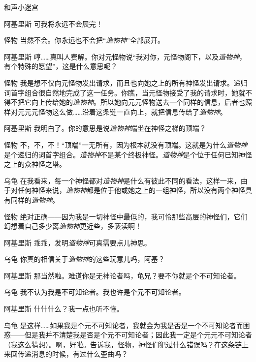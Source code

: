 \begin{dialog}{和声小迷宫}
\begin{dialogue}
\begin{dialogue}
\begin{dialogue}
    \item[阿基里斯]可我将永远不会展完！

    \item[怪物]当然不会。你永远也不会把“\emph{造物神}”全部展开。

    \item[阿基里斯]哼……真叫人费解。你对元怪物说“我对你，元怪物阁下，以及\emph{造物神}，有个特殊的愿望”，这是什么意思呢？

    \item[怪物]我是想不仅向元怪物发出请求，而且也向她之上的所有神怪发出请求。递归词首字组合很自然地完成了这一任务。你瞧，当元怪物接受了我的请求时，她就不得不把它向上传给她的\emph{造物神}。所以她向元元怪物送去一个同样的信息，后者也照样对元元元怪物这么做……沿着这条链一直向上，就把信息传给了\emph{造物神}。

    \item[阿基里斯]我明白了。你的意思是说\emph{造物神}端坐在神怪之梯的顶端？

    \item[怪物]不，不，不！“顶端”一无所有，因为根本就没有顶端。这就是为什么\emph{造物神}是个递归的词首字组合。\emph{造物神}不是某个终极神怪。\emph{造物神}是个位于任何已知神怪之上的众神怪之塔。

    \item[乌龟]在我看来，每一个神怪都对\emph{造物神}是什么有彼此不同的看法，这样一来，由于对任何神怪来说，\emph{造物神}都是位于他或她之上的一组神怪，所以没有两个神怪具有同样的\emph{造物神}。

    \item[怪物]绝对正确——因为我是一切神怪中最低的，我可怜那些高层的神怪们，它们幻想着自己多少离\emph{造物神}更近些，多亵渎啊！

    \item[阿基里斯]乖乖，发明\emph{造物神}可真需要点儿神思。

    \item[乌龟]你真的相信关于\emph{造物神}的这些玩意儿吗，阿基？

    \item[阿基里斯]那当然啦。难道你是无神论者吗，龟兄？要不你就是个不可知论者。

    \item[乌龟]我不认为我是不可知论者。我也许是个元不可知论者。

    \item[阿基里斯]什什什么？我一点也听不懂。

    \item[乌龟]是这样……如果我是个元不可知论者，我就会为我是否是一个不可知论者而困惑——但是我并不清楚我是否是个元不可知论者；因此我一定是个元元不可知论者（我这么猜想）。啊，好啦。告诉我，怪物，神怪们犯过什么错误吗？在这条链上来回传递消息的时候，有过什么歪曲吗？


\end{dialogue}
\end{dialogue}
\end{dialogue}
\end{dialog}
